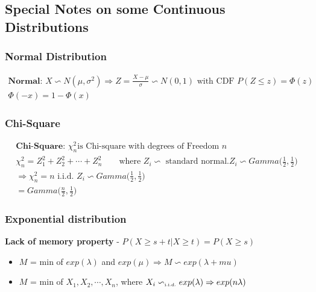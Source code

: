 \subsection*{Special Notes on some Continuous Distributions}
\subsubsection*{Normal Distribution}
\begin{gather*}
	\textbf{Normal: } X \backsim N(\mu, \sigma^2) \Rightarrow Z = \frac{X- \mu}{\sigma} \backsim N(0,1) \text{ with CDF } P(Z \leq z) = \Phi(z)\\
	\Phi(-x) = 1 - \Phi(x) 
\end{gather*}
\subsubsection*{Chi-Square}
\begin{gather*}
	\textbf{Chi-Square: } \chi^2_n \text{is Chi-square with degrees of Freedom }n\\
	\chi^2_n = Z_1^2 + Z_2^2 + \cdots + Z_n^2 \quad \quad \text{where $Z_i \backsim$ standard normal}. Z_i \backsim Gamma\bigg(\frac{1}{2},\frac{1}{2}\bigg)\\
	\Rightarrow \chi^2_n = n \text{ i.i.d. } Z_i \backsim Gamma\bigg(\frac{1}{2},\frac{1}{2}\bigg)\\
	= Gamma\bigg(\frac{n}{2},\frac{1}{2}\bigg)
\end{gather*}
\subsubsection*{Exponential distribution}
\textbf{Lack of memory property} - $P(X \geq s+t | X\geq t) = P(X \geq s)$
\begin{itemize}
	\item $M$ = min of $exp(\lambda)$ and $exp(\mu) \Rightarrow M \backsim exp(\lambda + mu)$
	\item $M$ = min of $X_1, X_2, \cdots, X_n$, where $X_i \backsim_{\text{\tiny i.i.d.}} exp(\lambda) \Rightarrow exp(n\lambda)$ 
\end{itemize}
